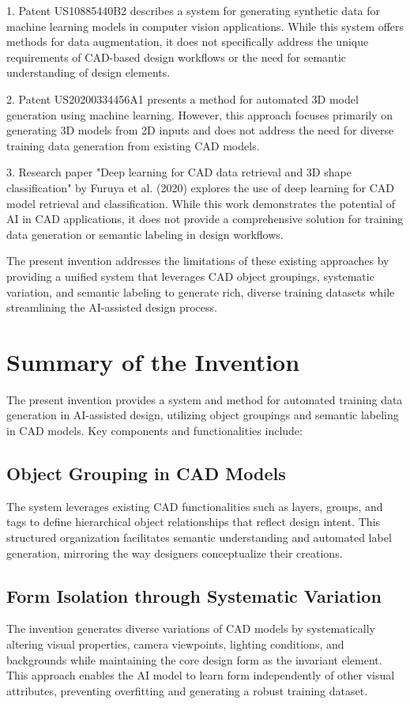 \documentclass{article}
\begin{document}
1. Patent US10885440B2 describes a system for generating synthetic data for machine learning models in computer vision applications. While this system offers methods for data augmentation, it does not specifically address the unique requirements of CAD-based design workflows or the need for semantic understanding of design elements.

2. Patent US20200334456A1 presents a method for automated 3D model generation using machine learning. However, this approach focuses primarily on generating 3D models from 2D inputs and does not address the need for diverse training data generation from existing CAD models.

3. Research paper "Deep learning for CAD data retrieval and 3D shape classification" by Furuya et al. (2020) explores the use of deep learning for CAD model retrieval and classification. While this work demonstrates the potential of AI in CAD applications, it does not provide a comprehensive solution for training data generation or semantic labeling in design workflows.

The present invention addresses the limitations of these existing approaches by providing a unified system that leverages CAD object groupings, systematic variation, and semantic labeling to generate rich, diverse training datasets while streamlining the AI-assisted design process.

\section{Summary of the Invention}

The present invention provides a system and method for automated training data generation in AI-assisted design, utilizing object groupings and semantic labeling in CAD models. Key components and functionalities include:

\subsection{Object Grouping in CAD Models}
The system leverages existing CAD functionalities such as layers, groups, and tags to define hierarchical object relationships that reflect design intent. This structured organization facilitates semantic understanding and automated label generation, mirroring the way designers conceptualize their creations.

\subsection{Form Isolation through Systematic Variation}
The invention generates diverse variations of CAD models by systematically altering visual properties, camera viewpoints, lighting conditions, and backgrounds while maintaining the core design form as the invariant element. This approach enables the AI model to learn form independently of other visual attributes, preventing overfitting and generating a robust training dataset.
\end{document}
